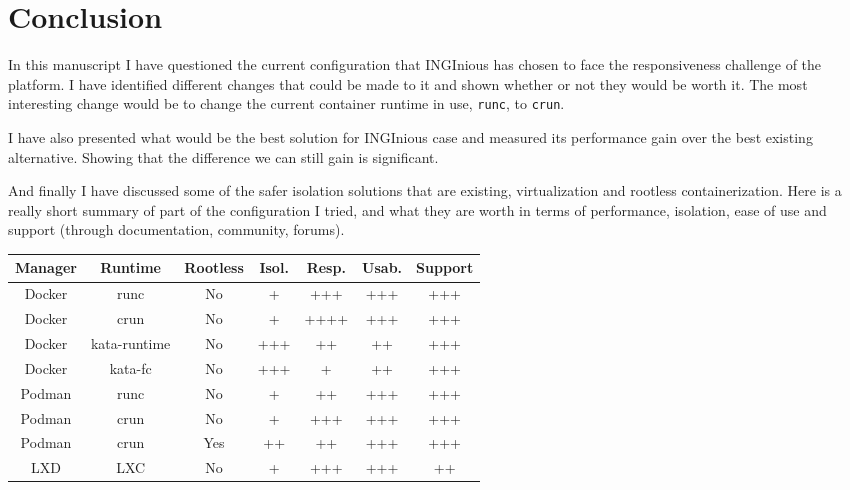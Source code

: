 \chapter{Conclusion}

In this manuscript I have questioned the current configuration that INGInious has chosen to face the responsiveness challenge of the platform.  I have identified different changes that could be made to it and shown whether or not they would be worth it.  The most interesting change would be to change the current container runtime in use, \texttt{runc}, to \texttt{crun}.

I have also presented what would be the best solution for INGInious case and measured its performance gain over the best existing alternative.  Showing that the difference we can still gain is significant.

And finally I have discussed some of the safer isolation solutions that are existing, virtualization and rootless containerization.  Here is a really short summary of part of the configuration I tried, and what they are worth in terms of performance, isolation, ease of use and support (through documentation, community, forums).

\begin{center}
  \begin{tabular}{|ccc|c|c|c|c|}
    \hline
    \textbf{Manager} & \textbf{Runtime} & \textbf{Rootless} & \textbf{Isol.}\footnotemark & \textbf{Resp.}\footnotemark & \textbf{Usab.}\footnotemark & \textbf{Support} \\
    \hline
    \hline
    Docker & runc & No & + & +++ & +++ & +++ \\
    Docker & crun & No & + & ++++ & +++ & +++\\
    Docker & kata-runtime\footnotemark & No & +++ & ++ & ++ & +++\\
    Docker & kata-fc\footnotemark & No & +++ & + & ++ & +++\\
    Podman & runc & No & + & ++ & +++ & +++\\
    Podman & crun & No & + & +++ & +++ & +++\\
    Podman & crun & Yes & ++ & ++ & +++ & +++\\
    LXD & LXC & No & + & +++ & +++ & ++\\
    \hline
  \end{tabular}
\end{center}

